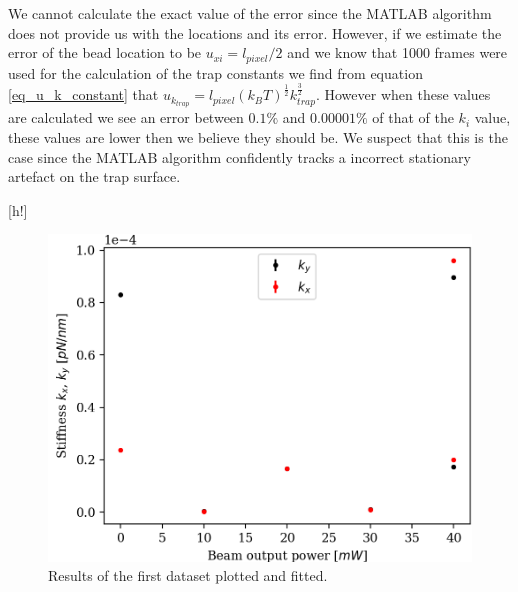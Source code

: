 We cannot calculate the exact value of the error since the MATLAB algorithm does not provide us with the locations and its error. However, if we estimate the error of the bead location to be $u_{xi} = l_{pixel}/2$ and we know that 1000 frames were used for the calculation of the trap constants we find from equation \ref{eq_u_k_constant} that $u_{k_{trap}} = l_{pixel} (k_B T)^{\frac{1}{2}}  k_{trap} ^{\frac{3}{2}}$. However when these values are calculated we see an error between $0.1\%$ and $0.00001\%$ of that of the $k_{i}$ value, these values are lower then we believe they should be. We suspect that this is the case since the MATLAB algorithm confidently tracks a incorrect stationary artefact on the trap surface.


\begin{minipage}{\linewidth}[h!]
    \begin{minipage}[l]{0.45\linewidth}
        \begin{figure}[H]
            \centering
            \includegraphics[width=\linewidth]{figures/beam.png}
            \caption{Results of the first dataset plotted and fitted.\\}
            \label{fig:bead-plot}
        \end{figure}
    \end{minipage}
    \hfill
    \begin{minipage}[r]{0.45\linewidth}
        \begin{figure}[H]
            \centering

\end{figure}
\end{minipage}
\end{minipage}
